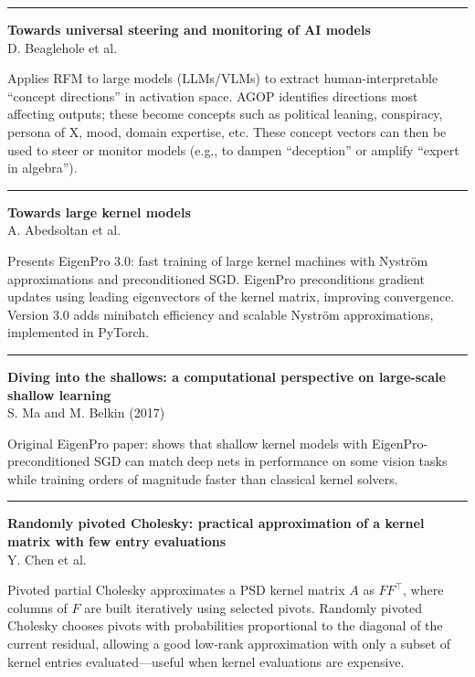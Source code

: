 \documentclass[a5paper]{article}
\begin{document}
\begin{center}\rule{0.5\linewidth}{0.5pt}\end{center}

\textbf{Towards universal steering and monitoring of AI models}\\
D. Beaglehole et al.

Applies RFM to large models (LLMs/VLMs) to extract human-interpretable
``concept directions'' in activation space. AGOP identifies directions
most affecting outputs; these become concepts such as political leaning,
conspiracy, persona of X, mood, domain expertise, etc. These concept
vectors can then be used to steer or monitor models (e.g., to dampen
``deception'' or amplify ``expert in algebra'').

\begin{center}\rule{0.5\linewidth}{0.5pt}\end{center}

\textbf{Towards large kernel models}\\
A. Abedsoltan et al.

Presents EigenPro 3.0: fast training of large kernel machines with
Nyström approximations and preconditioned SGD. EigenPro preconditions
gradient updates using leading eigenvectors of the kernel matrix,
improving convergence. Version 3.0 adds minibatch efficiency and
scalable Nyström approximations, implemented in PyTorch.

\begin{center}\rule{0.5\linewidth}{0.5pt}\end{center}

\textbf{Diving into the shallows: a computational perspective on
large-scale shallow learning}\\
S. Ma and M. Belkin (2017)

Original EigenPro paper: shows that shallow kernel models with
EigenPro-preconditioned SGD can match deep nets in performance on some
vision tasks while training orders of magnitude faster than classical
kernel solvers.

\begin{center}\rule{0.5\linewidth}{0.5pt}\end{center}

\textbf{Randomly pivoted Cholesky: practical approximation of a kernel
matrix with few entry evaluations}\\
Y. Chen et al.

Pivoted partial Cholesky approximates a PSD kernel matrix $A$ as $FF^\top$,
where columns of $F$ are built iteratively using selected pivots. Randomly
pivoted Cholesky chooses pivots with probabilities proportional to the
diagonal of the current residual, allowing a good low-rank approximation
with only a subset of kernel entries evaluated---useful when kernel
evaluations are expensive.
\end{document}
